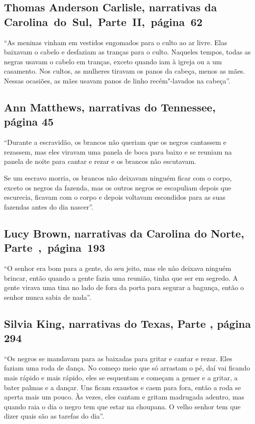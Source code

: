 \subsection{Thomas Anderson Carlisle, narrativas da Carolina~do~Sul,~Parte~II,~página~62}

``As meninas vinham em vestidos engomados para o culto ao ar livre. Elas
baixavam o cabelo e desfaziam as tranças para o culto. Naqueles tempos,
todas as negras usavam o cabelo em tranças, exceto quando iam à igreja
ou a um casamento. Nos cultos, as mulheres tiravam os panos da cabeça,
menos as mães. Nessas ocasiões, as mães usavam panos de linho
recém"-lavados na cabeça''.

\subsection{Ann Matthews, narrativas do Tennessee, página 45}
\label{ref184}

``Durante a escravidão, os brancos não queriam que os negros cantassem e
rezassem, mas eles viravam uma panela de boca para baixo e se reuniam na
panela de noite para cantar e rezar e os brancos não escutavam.

Se um escravo morria, os brancos não deixavam ninguém ficar com o corpo,
exceto os negros da fazenda, mas os outros negros se escapuliam depois
que escurecia, ficavam com o corpo e depois voltavam escondidos para as
suas fazendas antes do dia nascer''.

\subsection{Lucy Brown, narrativas da Carolina do Norte, Parte~,~página~193} \label{ref38}

``O senhor era bom para a gente, do seu jeito, mas ele não deixava
ninguém brincar, então quando a gente fazia uma reunião, tinha que ser
em segredo. A gente virava uma tina no lado de fora da porta para
segurar a bagunça, então o senhor nunca sabia de nada''.

\subsection{Silvia King, narrativas do Texas, Parte , página 294}
\label{ref166}

``Os negros se mandavam para as baixadas para gritar e cantar e rezar.
Eles faziam uma roda de dança. No começo meio que só arrastam o pé, daí
vai ficando mais rápido e mais rápido, eles se esquentam e começam a
gemer e a gritar, a bater palmas e a dançar. Uns ficam exaustos e caem
para fora, então a roda se aperta mais um pouco. Às vezes, eles cantam e
gritam madrugada adentro, mas quando raia o dia o negro tem que estar na
choupana. O velho senhor tem que dizer quais são as tarefas do dia''.

